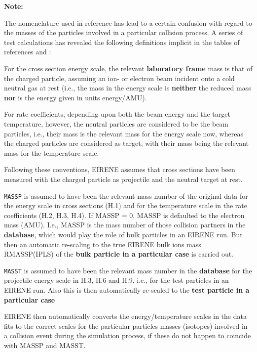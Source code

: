 \bigskip 

\textbf{Note:} 

The nomenclature used in reference \cite{kn:Janev} has lead to a certain
confusion with regard to the masses of the particles involved in a particular
collision process.
A series of test calculations has revealed the following definitions implicit
in the tables of references \cite{kn:Janev} and \cite{kn:Ehrhardt}:

For the cross section energy scale, the relevant \textbf{laboratory frame} mass
is that of the charged particle, assuming an ion- or electron beam incident
onto a cold neutral gas at rest (i.e., the mass in the energy scale is
\textbf{neither} the reduced mass \textbf{nor} is the energy given in units
energy/\ac{AMU}).

For rate coefficients, depending upon both the beam energy and the target
temperature, however, the neutral particles are considered to be the beam
particles, i.e., their mass is the relevant mass for the energy scale now,
whereas the charged particles are considered as target, with their mass being
the relevant mass for the temperature scale.

Following these conventions, EIRENE assumes that cross sections have been
measured with the charged particle as projectile and the neutral target at
rest.

\textcolor[rgb]{1.00,0.00,0.00}{\texttt{MASSP}} is assumed to have been the
relevant
mass number of the original data for the energy scale in cross
sections (H.1) and for the temperature scale in the rate
coefficients (H.2, H.3, H.4).
If MASSP = 0, MASSP is defaulted to the electron mass (\ac{AMU}).
I.e., MASSP is the mass number of those collision partners in the
\textbf{database}, which would play the role of bulk particles in an EIRENE
run.
But then an automatic re-scaling to the true EIRENE bulk ions mass RMASSP(IPLS)
of the \textbf{bulk particle in a particular case} is carried out.

\textcolor[rgb]{1.00,0.00,0.00}{\texttt{MASST}} is assumed to have been the
relevant mass number in the \textbf{database}
for the
projectile energy scale in H.3, H.6 and H.9, i.e., for the test
particles in an EIRENE run.
Also this is then automatically re-scaled to the \textbf{test particle in a particular case} 

EIRENE then automatically converts the energy/temperature scales in the data
fits to the correct scales for the particular particles masses (isotopes)
involved in a collision event during the simulation process, if these do not
happen to coincide with MASSP and MASST.

